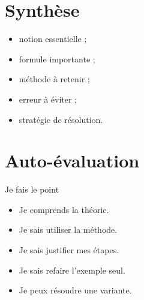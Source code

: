 \documentclass[11pt,a4paper]{article}
\begin{document}
\section{Synthèse}

\begin{cadresynthese}
\begin{itemize}
    \item notion essentielle ;
    \item formule importante ;
    \item méthode à retenir ;
    \item erreur à éviter ;
    \item stratégie de résolution.
\end{itemize}
\end{cadresynthese}

\section{Auto-évaluation}

\begin{cadregris}{Je fais le point}
\begin{itemize}
    \item[$\square$] Je comprends la théorie.
    \item[$\square$] Je sais utiliser la méthode.
    \item[$\square$] Je sais justifier mes étapes.
    \item[$\square$] Je sais refaire l’exemple seul.
    \item[$\square$] Je peux résoudre une variante.
\end{itemize}
\end{cadregris}
\end{document}
